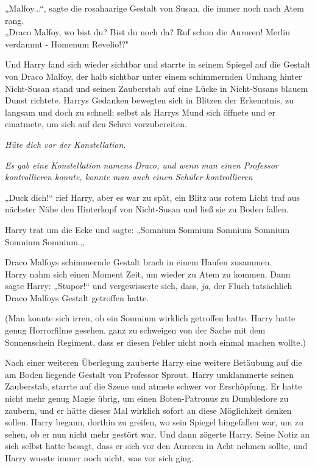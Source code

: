 {„Malfoy...“, sagte die rosahaarige Gestalt von Susan, die immer noch nach Atem rang.\\ „Draco Malfoy, wo bist du? Bist du noch da? Ruf schon die Auroren! Merlin verdammt - Homenum Revelio!?"

Und Harry fand sich wieder sichtbar und starrte in seinem Spiegel auf die Gestalt von Draco Malfoy, der halb sichtbar unter einem schimmernden Umhang hinter Nicht-Susan stand und seinen Zauberstab auf eine Lücke in Nicht-Susans blauem Dunst richtete. Harrys Gedanken bewegten sich in Blitzen der Erkenntnis, zu langsam und doch zu schnell; selbst als Harrys Mund sich öffnete und er einatmete, um sich auf den Schrei vorzubereiten.

\emph{Hüte dich vor der Konstellation.}

\emph{Es gab eine Konstellation namens Draco, und wenn man einen Professor kontrollieren konnte, konnte man auch einen Schüler kontrollieren}

„Duck dich!“ rief Harry, aber es war zu spät, ein Blitz aus rotem Licht traf aus nächster Nähe den Hinterkopf von Nicht-Susan und ließ sie zu Boden fallen.

Harry trat um die Ecke und sagte: „Somnium Somnium Somnium Somnium Somnium Somnium.„

Draco Malfoys schimmernde Gestalt brach in einem Haufen zusammen.\\ Harry nahm sich einen Moment Zeit, um wieder zu Atem zu kommen. Dann sagte Harry: „Stupor!“ und vergewisserte sich, dass, \emph{ja}, der Fluch tatsächlich Draco Malfoys Gestalt getroffen hatte.

(Man konnte sich irren, ob ein Somnium wirklich getroffen hatte. Harry hatte genug Horrorfilme gesehen, ganz zu schweigen von der Sache mit dem Sonnenschein Regiment, dass er diesen Fehler nicht noch einmal machen wollte.)

Nach einer weiteren Überlegung zauberte Harry eine weitere Betäubung auf die am Boden liegende Gestalt von Professor Sprout. Harry umklammerte seinen Zauberstab, starrte auf die Szene und atmete schwer vor Erschöpfung. Er hatte nicht mehr genug Magie übrig, um einen Boten-Patronus zu Dumbledore zu zaubern, und er hätte dieses Mal wirklich sofort an diese Möglichkeit denken sollen. Harry begann, dorthin zu greifen, wo sein Spiegel hingefallen war, um zu sehen, ob er nun nicht mehr gestört war. Und dann zögerte Harry. Seine Notiz an sich selbst hatte besagt, dass er sich vor den Auroren in Acht nehmen sollte, und Harry wusste immer noch nicht, was vor sich ging.

}
